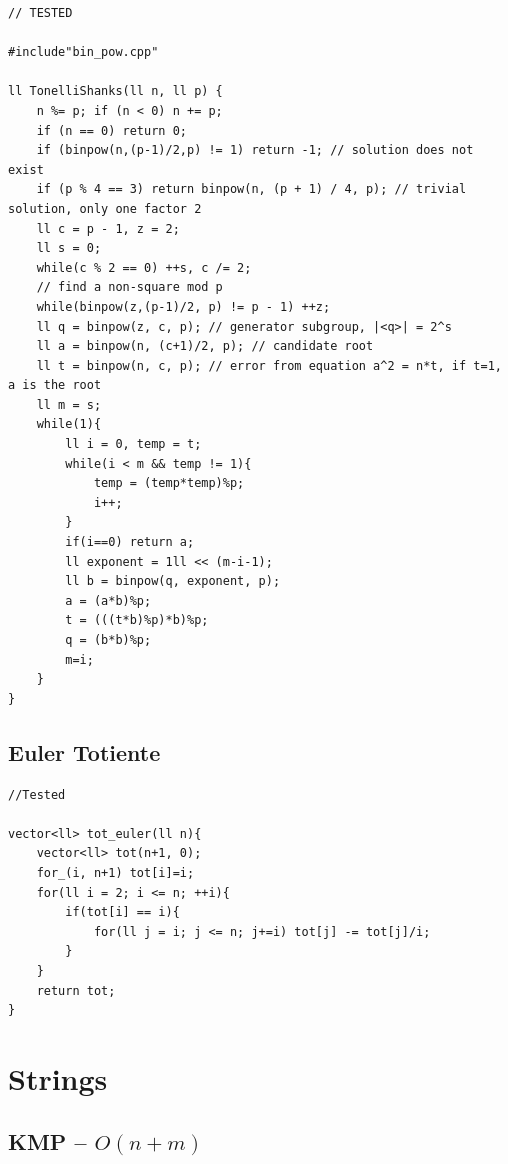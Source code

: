 \documentclass[10pt,a4paper,twocolumn]{article}
\begin{document}
	\begin{lstlisting}[style=cpp, title={TonelliShanks.cpp}]
// TESTED

#include"bin_pow.cpp"

ll TonelliShanks(ll n, ll p) {
    n %= p; if (n < 0) n += p;
    if (n == 0) return 0;
    if (binpow(n,(p-1)/2,p) != 1) return -1; // solution does not exist
    if (p % 4 == 3) return binpow(n, (p + 1) / 4, p); // trivial solution, only one factor 2
    ll c = p - 1, z = 2;
    ll s = 0;
    while(c % 2 == 0) ++s, c /= 2;
    // find a non-square mod p
    while(binpow(z,(p-1)/2, p) != p - 1) ++z;
    ll q = binpow(z, c, p); // generator subgroup, |<q>| = 2^s
    ll a = binpow(n, (c+1)/2, p); // candidate root
    ll t = binpow(n, c, p); // error from equation a^2 = n*t, if t=1, a is the root
    ll m = s;
    while(1){
        ll i = 0, temp = t;
        while(i < m && temp != 1){
            temp = (temp*temp)%p;
            i++;
        }
        if(i==0) return a;
        ll exponent = 1ll << (m-i-1);
        ll b = binpow(q, exponent, p);
        a = (a*b)%p;
        t = (((t*b)%p)*b)%p;
        q = (b*b)%p;
        m=i;
    }
}
	\end{lstlisting}

	\subsection{Euler Totiente}
	
	\begin{lstlisting}[style=cpp, title={tot-euler.cpp}]
//Tested

vector<ll> tot_euler(ll n){
    vector<ll> tot(n+1, 0);
    for_(i, n+1) tot[i]=i;
    for(ll i = 2; i <= n; ++i){
        if(tot[i] == i){
            for(ll j = i; j <= n; j+=i) tot[j] -= tot[j]/i;
        }
    }
    return tot;
}
	\end{lstlisting}

	\section{Strings}
	
	\subsection{KMP -- $O(n+m)$}
	
\end{document}
